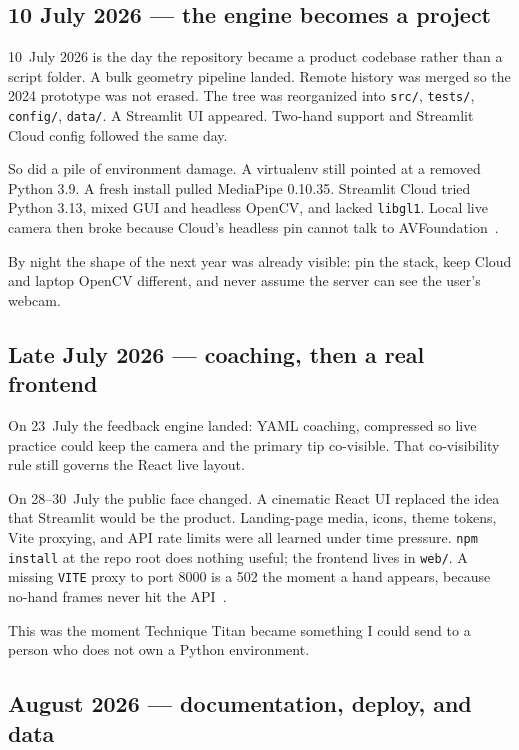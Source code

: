 \documentclass[11pt,a4paper]{article}
\newcommand{\code}[1]{\texttt{#1}}
\begin{document}
\subsection{10 July 2026 --- the engine becomes a project}

10~July 2026 is the day the repository became a product codebase rather than a script folder.
A bulk geometry pipeline landed.
Remote history was merged so the 2024 prototype was not erased.
The tree was reorganized into \code{src/}, \code{tests/}, \code{config/}, \code{data/}.
A Streamlit UI appeared.
Two-hand support and Streamlit Cloud config followed the same day.

So did a pile of environment damage.
A virtualenv still pointed at a removed Python 3.9.
A fresh install pulled MediaPipe 0.10.35.
Streamlit Cloud tried Python 3.13, mixed GUI and headless OpenCV, and lacked \code{libgl1}.
Local live camera then broke because Cloud's headless pin cannot talk to AVFoundation~\cite{errors}.

By night the shape of the next year was already visible: pin the stack, keep Cloud and laptop OpenCV different, and never assume the server can see the user's webcam.

\subsection{Late July 2026 --- coaching, then a real frontend}

On 23~July the feedback engine landed: YAML coaching, compressed so live practice could keep the camera and the primary tip co-visible.
That co-visibility rule still governs the React live layout.

On 28--30~July the public face changed.
A cinematic React UI replaced the idea that Streamlit would be the product.
Landing-page media, icons, theme tokens, Vite proxying, and API rate limits were all learned under time pressure.
\code{npm install} at the repo root does nothing useful; the frontend lives in \code{web/}.
A missing \code{VITE} proxy to port 8000 is a 502 the moment a hand appears, because no-hand frames never hit the API~\cite{errors}.

This was the moment Technique Titan became something I could send to a person who does not own a Python environment.

\subsection{August 2026 --- documentation, deploy, and data}
\end{document}
